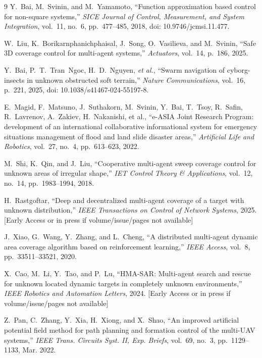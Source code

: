 \documentclass[fleqn,10pt,twocolumn]{main}
\begin{document}
\begin{thebibliography}{9}
Y.~Bai, M.~Svinin, and M.~Yamamoto, 
``Function approximation based control for non-square systems,'' 
\emph{SICE Journal of Control, Measurement, and System Integration}, vol.~11, no.~6, pp.~477--485, 2018, 
doi: 10.9746/jcmsi.11.477.


W.~Liu, K.~Borikarnphanichphaisal, J.~Song, O.~Vasilieva, and M.~Svinin, ``Safe 3D coverage control for multi-agent systems,'' \emph{Actuators}, vol.~14, p.~186, 2025.

Y.~Bai, P.~T.~Tran~Ngoc, H.~D.~Nguyen, \emph{et al.}, 
``Swarm navigation of cyborg-insects in unknown obstructed soft terrain,'' 
\emph{Nature Communications}, vol.~16, p.~221, 2025, 
doi: 10.1038/s41467-024-55197-8.

E.~Magid, F.~Matsuno, J.~Suthakorn, M.~Svinin, Y.~Bai, T.~Tsoy, R.~Safin, R.~Lavrenov, A.~Zakiev, H.~Nakanishi, et al.,
``e-ASIA Joint Research Program: development of an international collaborative informational system for emergency situations management of flood and land slide disaster areas,''
\textit{Artificial Life and Robotics}, vol.~27, no.~4, pp.~613--623, 2022.


M.~Shi, K.~Qin, and J.~Liu, ``Cooperative multi-agent sweep coverage control for unknown areas of irregular shape,'' \emph{IET Control Theory \& Applications}, vol.~12, no.~14, pp.~1983--1994, 2018.


H.~Rastgoftar, ``Deep and decentralized multi-agent coverage of a target with unknown distribution,'' \emph{IEEE Transactions on Control of Network Systems}, 2025. [Early Access or in press if volume/issue/pages not available]

J.~Xiao, G.~Wang, Y.~Zhang, and L.~Cheng, ``A distributed multi-agent dynamic area coverage algorithm based on reinforcement learning,'' \emph{IEEE Access}, vol.~8, pp.~33511--33521, 2020.

X.~Cao, M.~Li, Y.~Tao, and P.~Lu, ``HMA-SAR: Multi-agent search and rescue for unknown located dynamic targets in completely unknown environments,'' \emph{IEEE Robotics and Automation Letters}, 2024. [Early Access or in press if volume/issue/pages not available]

Z.~Pan, C.~Zhang, Y.~Xia, H.~Xiong, and X.~Shao, ``An improved artificial potential field method for path planning and formation control of the multi-UAV systems,'' \emph{IEEE Trans. Circuits Syst. II, Exp. Briefs}, vol.~69, no.~3, pp.~1129--1133, Mar. 2022.


\end{thebibliography}
\end{document}
